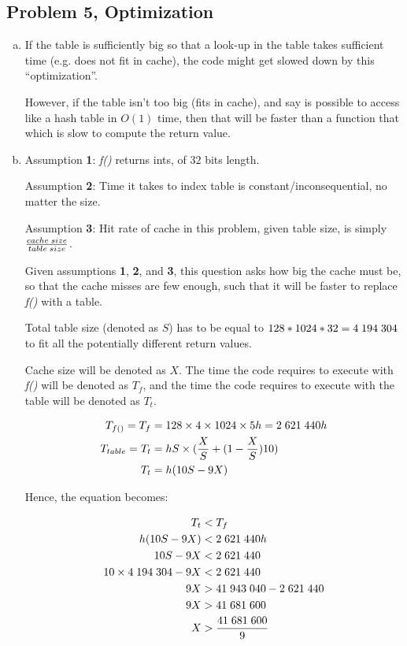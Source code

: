 \documentclass[fontsize=11pt, paper=a4, titlepage]{article}
\begin{document}
\subsection{Problem 5, Optimization}
\begin{enumerate}[a)]

    \item If the table is sufficiently big so that a look-up in the table takes
sufficient time (e.g. does not fit in cache), the code might get slowed down by this ``optimization''.

However, if the table isn't too big (fits in cache), and say is possible to
access like a hash table in $O(1)$ time, then that will be faster than a
function that which is slow to compute the return value.

    \item Assumption \textbf{1}: \textit{f()} returns ints, of $32$ bits length.

Assumption \textbf{2}: Time it takes to index table is constant/inconsequential,
no matter the size.

Assumption \textbf{3}: Hit rate of cache in this problem,
given table size, is simply $\frac{cache\thickspace size}{table\thickspace size}$.

Given assumptions \textbf{1}, \textbf{2}, and \textbf{3}, this question asks how
big the cache must be, so that the cache misses are few enough, such that it
will be faster to replace \textit{f()} with a table.

Total table size (denoted as $S$) has to be equal to $128*1024*32 = 4\thickspace
194\thickspace 304$ to fit all the potentially different return values.

Cache size will be denoted as $X$. The time the code requires to execute with
\textit{f()} will be denoted as $T_f$, and the time the code requires to execute
with the table will be denoted as $T_t$.

    \begin{align*}
        T_{f()} = T_f &= 128\times 4\times 1024\times 5h
        = 2\thickspace 621\thickspace 440h \\
        T_{table} = T_t &= hS\times(\frac{X}{S} + (1-\frac{X}{S})10)\\
        T_t &= h(10S- 9X)
    \end{align*}

Hence, the equation becomes:

    \begin{align*}
        T_t &< T_f \\
        h(10S-9X) &< 2\thickspace 621\thickspace 440h \\
        10S - 9X &< 2\thickspace 621\thickspace 440 \\
        10\times 4\thickspace 194\thickspace 304 -9X &< 2\thickspace 621\thickspace 440 \\
        9X &> 41\thickspace 943\thickspace 040 - 2\thickspace 621\thickspace 440 \\
        9X &> 41\thickspace 681\thickspace 600 \\
        X &> \frac{41\thickspace 681\thickspace 600}{9}
    \end{align*}


\end{enumerate}
\end{document}
